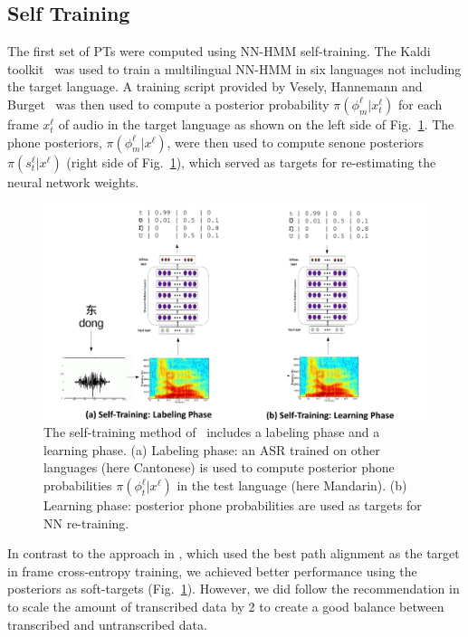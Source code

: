 \subsection{Self Training}
\label{sec:selftraining}

The first set of PTs were computed using NN-HMM self-training.  The
Kaldi toolkit~\cite{Kaldi2011} was used to train a multilingual NN-HMM
in six languages not including the target language.  A training script
provided by Vesely, Hannemann and Burget~\cite{vesely2013-semi} was
then used to compute a posterior probability
$\pi(\phi_m^\ell|x_t^\ell)$ for each frame $x_t^\ell$ of audio in the
target language as shown on the left side of Fig.~\ref{fig:hager}.
The phone posteriors, $\pi(\phi_m^\ell|x^\ell)$, were then used to
compute senone posteriors $\pi(s_t^\ell|x^\ell)$ (right side of
Fig.~\ref{fig:hager}), which served as targets for re-estimating the
neural network weights.
\begin{figure}
  \centerline{\includegraphics[width=5in]{../figs/fig_hager.png}}
  \caption{The self-training method of~\cite{vesely2013-semi} includes
    a labeling phase and a learning phase.  (a) Labeling phase: an ASR
    trained on other languages (here Cantonese) is used to compute
    posterior phone probabilities $\pi(\phi_t^\ell|x^\ell)$ in the
    test language (here Mandarin). (b) Learning phase: posterior phone
    probabilities are used as targets for NN re-training.}
  \label{fig:hager}
\end{figure}

In contrast to the approach in \cite{vesely2013-semi}, which used the
best path alignment as the target in frame cross-entropy training, we
achieved better performance using the posteriors as soft-targets
(Fig.~\ref{fig:hager}). However, we did follow the recommendation in
\cite{vesely2013-semi} to scale the amount of transcribed data by 2 to 
create a good balance between transcribed and untranscribed data.
